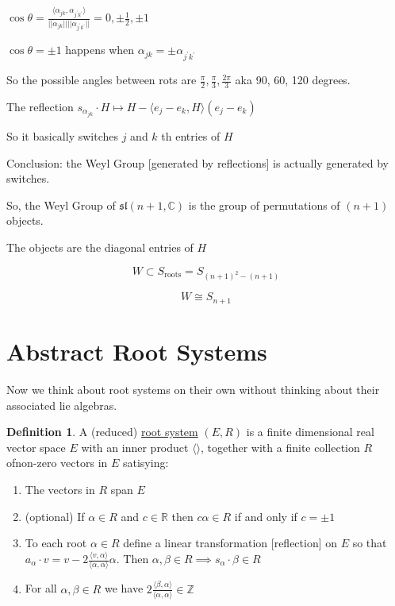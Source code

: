 \documentclass{article}
\theoremstyle{definition}
\newtheorem{definition}{Definition}
\begin{document}
\(\cos \theta = \frac{\langle \alpha _{jk},\alpha _{j^{\prime} k^{\prime} } \rangle }{\vert \vert \alpha _{jk} \vert  \vert \vert \vert \alpha _{j^{\prime} k^{\prime} } \vert  \vert } = 0, \pm \frac{1}{2}, \pm 1\)

\(\cos \theta =\pm 1\) happens when \(\alpha_{jk}=\pm \alpha_{j^{\prime} k^{\prime} }\) 

So the possible angles between rots are \(\frac{\pi}{2},\frac{\pi}{3},\frac{2\pi}{3}\) aka 90, 60, 120 degrees.

The reflection \(s_{ \alpha_{jk} } \cdot H \mapsto H - \langle e_j - e_k, H \rangle (e_j - e_k )  \) 

So it basically switches \(j\) and \(k\) th entries of \(H\) 

Conclusion: the Weyl Group [generated by reflections] is actually generated by switches.

So, the Weyl Group of \(\mathfrak{sl}(n+1,\mathbb{C}) \) is the group of permutations of \((n+1)\) objects.

The objects are the diagonal entries of \(H\) 

\[
    W \subset S_{\text{roots}} =S_{(n+1)^2 - (n+1) }
\]

\[
    W \cong S_{n+1}
\]

\section*{Abstract Root Systems}

Now we think about root systems on their own without thinking about their associated lie algebras.

\begin{definition}
    A (reduced) \underline{root system} \((E,R)\) is a finite dimensional real vector space \(E\) with an inner product \(\langle  \rangle \), together with a finite collection \(R\) ofnon-zero vectors in \(E\) satisying:

    \begin{enumerate}
        \item The vectors in \(R\) span \(E\) 
        \item (optional) If \(\alpha \in R\) and \(c\in\mathbb{R} \) then \(c \alpha \in R\) if and only if \(c=\pm 1\) 
        \item To each root \(\alpha \in R\) define a linear transformation [reflection] on \(E\) so that \(a_\alpha \cdot v = v - 2 \frac{\langle v,\alpha \rangle }{\langle \alpha ,\alpha  \rangle }\alpha\). Then \(\alpha ,\beta \in R \implies s_\alpha \cdot \beta \in R\) 
        \item For all \(\alpha ,\beta \in R\) we have \(2 \frac{\langle \beta ,\alpha  \rangle}{\langle \alpha ,\alpha  \rangle } \in \mathbb{Z} \)  
    \end{enumerate}

\end{definition}
\end{document}
